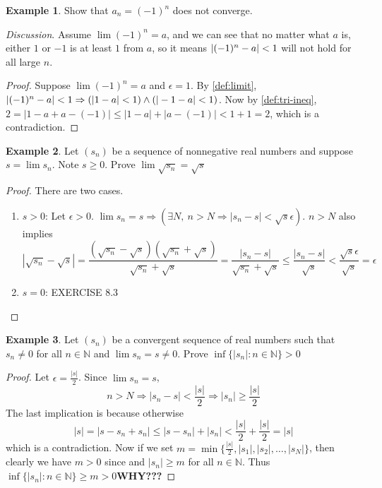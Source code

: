 \documentclass[12pt, lettersize]{book}
\theoremstyle{plain}
\theoremstyle{definition}
\newtheorem*{eg}{Example}
\theoremstyle{remark}
\begin{document}
	\begin{eg}
		Show that $a_n=(-1)^n$ does not converge.
	\end{eg}
	\emph{Discussion}. Assume $\lim(-1)^n=a$, and we can see that no matter what $a$ is, either $1$ or $-1$ is at least
	$1$ from $a$, so it means $\abs{(-1)^n-a}<1$ will not hold for all large $n$.
	\begin{proof}
		Suppose $\lim(-1)^n=a$ and $\epsilon = 1$. By \ref{def:limit}, $\abs{(-1)^n-a}<1 \Rightarrow (|1-a|<1)\land(|-1-a|<1)$.
		Now by \ref{def:tri-ineq}, $2=|1-a+a-(-1)|\leq|1-a|+|a-(-1)|<1+1=2$, which is a contradiction. 
	\end{proof}
	
	\begin{eg}
		Let $(s_n)$ be a sequence of nonnegative real numbers and suppose $s=\lim s_n$. Note $s\geq0$. Prove $\lim\sqrt{s_n}=\sqrt{s}$
	\end{eg}
	\begin{proof}
		There are two cases.
		\begin{enumerate}
			\item $s>0$: Let $\epsilon>0$. $\lim s_n=s \Rightarrow (\exists N,\ n>N \Rightarrow |s_n-s|<\sqrt{s}\epsilon)$.
			$n>N$ also implies
			\begin{displaymath}
				|\sqrt{s_n}-\sqrt{s}|=\frac{(\sqrt{s_n}-\sqrt{s})(\sqrt{s_n}+\sqrt{s})}{\sqrt{s_n}+\sqrt{s}}=\frac{|s_n-s|}{\sqrt{s_n}+\sqrt{s}}\leq\frac{|s_n-s|}{\sqrt{s}}<\frac{\sqrt{s}\epsilon}{\sqrt{s}}=\epsilon
			\end{displaymath}
			\item $s=0$: EXERCISE 8.3 
		\end{enumerate}
	\end{proof}
	
	\begin{eg}
		Let $(s_n)$ be a convergent sequence of real numbers such that $s_n\neq0$ for all $n\in \mathbb{N}$ and $\lim s_n=s
		\neq0$. Prove $\inf\{|s_n|: n\in\mathbb{N}\}>0$
	\end{eg}
	\begin{proof}
		Let $\epsilon=\frac{|s|}{2}$. Since $\lim s_n=s$,
		\begin{displaymath}
			n>N \Rightarrow |s_n-s|<\frac{|s|}{2} \Rightarrow |s_n|\geq\frac{|s|}{2}
		\end{displaymath}
		The last implication is because otherwise 
		\begin{displaymath}
			|s|=|s-s_n+s_n|\leq|s-s_n|+|s_n|<\frac{|s|}{2}+\frac{|s|}{2}=|s|
		\end{displaymath}
		which is a contradiction. Now if we set $m=\min\{\frac{|s|}{2},|s_1|,|s_2|,\dots,|s_N|\}$, then clearly we have
		$m>0$ since and $|s_n|\geq m$ for all $n\in \mathbb{N}$. Thus $\inf\{|s_n|: n\in\mathbb{N}\}\geq m>0$\textbf{WHY???} 
	\end{proof}
	\newpage
	
\end{document}
